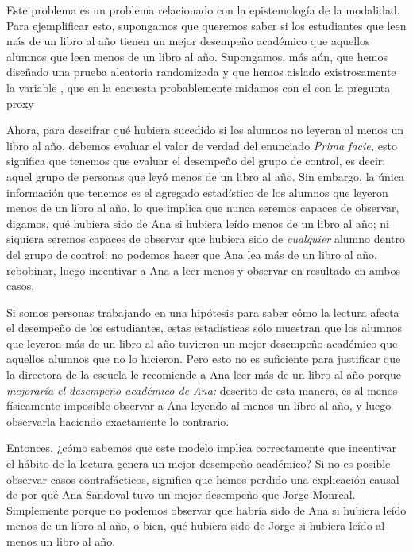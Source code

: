 Este problema es un problema relacionado con la
epistemología de la modalidad. Para ejemplificar esto, supongamos que queremos saber si los estudiantes
que leen más de un libro al año tienen un mejor desempeño
académico que aquellos alumnos que leen menos de un libro al
año. Supongamos, más aún, que hemos diseñado una prueba
aleatoria randomizada y que hemos aislado existrosamente la
variable , que en la
encuesta probablemente midamos con el con la pregunta proxy

Ahora, para descifrar qué hubiera sucedido si los alumnos no
leyeran al menos un libro al año, debemos evaluar el valor
de verdad del enunciado  \emph{Prima facie,} esto significa que tenemos que
evaluar el desempeño del grupo de control, es decir: aquel
grupo de personas que leyó menos de un libro al año. Sin
embargo, la única información que tenemos es el agregado
estadístico de los alumnos que leyeron menos de un libro al
año, lo que implica que nunca seremos capaces de observar,
digamos, qué hubiera sido de Ana si hubiera leído menos de un
libro al año; ni siquiera seremos capaces de observar que
hubiera sido de \emph{cualquier} alumno dentro del grupo de
control: no podemos hacer que Ana lea más de un libro al
año, rebobinar, luego incentivar a Ana a leer menos y
observar en resultado en ambos casos.

Si somos personas trabajando en una hipótesis para saber
cómo la lectura afecta el desempeño de los estudiantes,
estas estadísticas sólo muestran que los alumnos que leyeron
más de un libro al año tuvieron un mejor desempeño académico
que aquellos alumnos que no lo hicieron. Pero esto no es
suficiente para justificar que la directora de la escuela le
recomiende a Ana leer más de un libro al año porque
\emph{mejoraría el desempeño académico de Ana:} descrito de
esta manera, es al menos físicamente imposible observar a
Ana leyendo al menos un libro al año, y luego observarla
haciendo exactamente lo contrario.

Entonces, ¿cómo sabemos que este modelo implica
correctamente que incentivar el hábito de la lectura genera
un mejor desempeño académico? Si no es posible observar
casos contrafácticos, significa que hemos perdido una
explicación causal de por qué Ana Sandoval tuvo un mejor
desempeño que Jorge Monreal. Simplemente porque no podemos
observar que habría sido de Ana si hubiera leído menos de un
libro al año, o bien, qué hubiera sido de Jorge si hubiera
leído al menos un libro al año.

